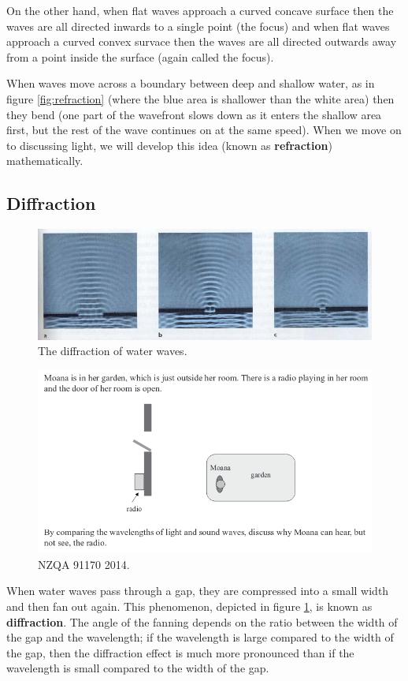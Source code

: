 \documentclass[a4paper]{amsbook}
\newcommand\capcite[1]{}
\begin{document}
On the other hand, when flat waves approach a curved concave surface then the waves are all directed inwards to a single point (the focus)
and when flat waves approach a curved convex survace then the waves are all directed outwards away from a point inside the surface (again called
the focus).

When waves move across a boundary between deep and shallow water, as in figure \ref{fig:refraction} (where the blue area is shallower than the white area)
then they bend (one part of the wavefront slows down as it enters the shallow area first, but the rest of the wave continues on at the same speed).
When we move on to discussing light, we will develop this idea (known as \textbf{refraction}) mathematically.

\subsection{Diffraction}
\begin{figure}
  \centering
  \includegraphics[width=\textwidth]{diffraction}
  \caption{The diffraction of water waves. \capcite{http://electron6.phys.utk.edu/light/images1-3/single1.jpg}\label{fig:diffraction}}
\end{figure}
\begin{figure}
  \centering
  \includegraphics[width=\textwidth]{diffraction14}
  \caption{NZQA 91170 2014. \label{fig:diffraction-exam}}
\end{figure}
When water waves pass through a gap, they are compressed into a small width and then fan out again. This phenomenon, depicted in
figure \ref{fig:diffraction}, is known as \textbf{diffraction}. The angle of the fanning depends on the ratio between the width of the
gap and the wavelength; if the wavelength is large compared to the width of the gap, then the diffraction effect is much more pronounced
than if the wavelength is small compared to the width of the gap.
\end{document}
